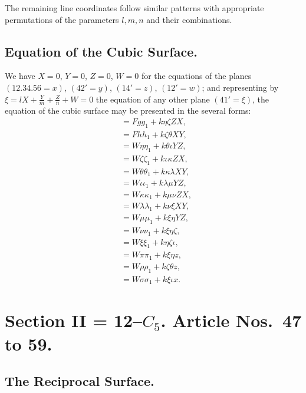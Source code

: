 \documentclass[11pt,a4paper]{article}
\begin{document}
The remaining line coordinates follow similar patterns with appropriate permutations of the parameters $l, m, n$ and their combinations.

\subsection*{Equation of the Cubic Surface.}

We have $X = 0$, $Y = 0$, $Z = 0$, $W = 0$ for the equations of the planes $(12.34.56 = x)$, $(42' = y)$, $(14' = z)$, $(12' = w)$; and representing by $\xi = lX + \frac{Y}{m} + \frac{Z}{n} + W = 0$ the equation of any other plane $(41' = \xi)$, the equation of the cubic surface may be presented in the several forms:
\begin{align*}
&= Fgg_1 + k\eta\zeta ZX, \\
&= Fhh_1 + k\zeta\theta XY, \\
&= W\eta\eta_1 + k\theta\iota YZ, \\
&= W\zeta\zeta_1 + k\iota\kappa ZX, \\
&= W\theta\theta_1 + k\kappa\lambda XY, \\
&= W\iota\iota_1 + k\lambda\mu YZ, \\
&= W\kappa\kappa_1 + k\mu\nu ZX, \\
&= W\lambda\lambda_1 + k\nu\xi XY, \\
&= W\mu\mu_1 + k\xi\eta YZ, \\
&= W\nu\nu_1 + k\xi\eta\zeta, \\
&= W\xi\xi_1 + k\eta\zeta\iota, \\
&= W\pi\pi_1 + k\xi\eta z, \\
&= W\rho\rho_1 + k\zeta\theta z, \\
&= W\sigma\sigma_1 + k\xi\iota x.
\end{align*}

\section*{Section II = 12--$C_5$. \quad Article Nos.~47 to 59.}

\setcounter{section}{47}
\subsection*{The Reciprocal Surface.}
\end{document}
